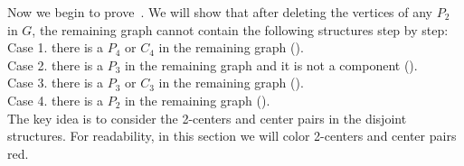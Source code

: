 \documentclass[a4paper]{article}
\newcommand{\emphd}[1]{{\fontseries{b}\selectfont\textsf{#1}}}
\begin{document}
Now we begin to prove~. We will show that after deleting the vertices of any $P_2$ in $G$, the remaining graph cannot contain the following structures step by step:\\

\emphd{Case 1.} there is a $P_4$ or $C_4$ in the remaining graph ().\\

\emphd{Case 2.} there is a $P_3$ in the remaining graph and it is not a component ().\\

\emphd{Case 3.} there is a $P_3$ or $C_3$ in the remaining graph ().\\

\emphd{Case 4.} there is a $P_2$ in the remaining graph ().\\

The key idea is to consider the 2-centers and center pairs in the disjoint structures. For readability, in this section we will color 2-centers and center pairs red.
\end{document}
